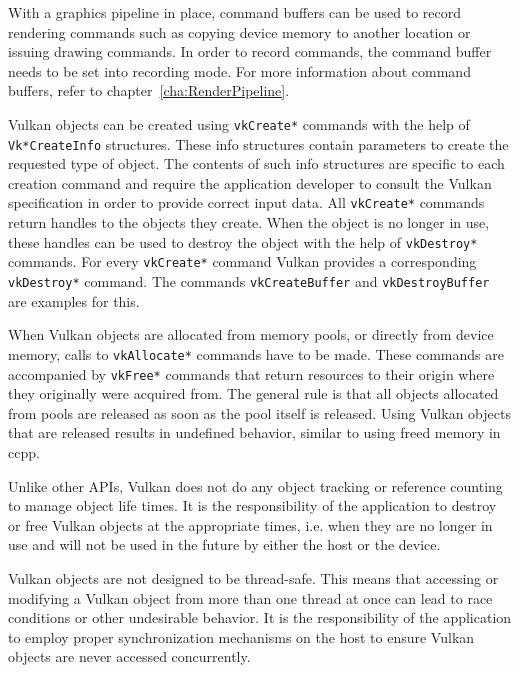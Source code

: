     With a graphics pipeline in place, command buffers can be used to record rendering commands such as copying \gls{device} memory to another location or issuing drawing commands. In order to record commands, the command buffer needs to be set into recording mode. For more information about command buffers, refer to chapter~\ref{cha:RenderPipeline}.

    Vulkan objects can be created using \lstinline{vkCreate*} commands with the help of \lstinline{Vk*CreateInfo} structures. These info structures contain parameters to create the requested type of object. The contents of such info structures are specific to each creation command and require the \gls{application} developer to consult the Vulkan specification in order to provide correct input data. All \lstinline{vkCreate*} commands return handles to the objects they create. When the object is no longer in use, these handles can be used to destroy the object with the help of \lstinline{vkDestroy*} commands. For every \lstinline{vkCreate*} command Vulkan provides a corresponding \lstinline{vkDestroy*} command. The commands \lstinline{vkCreateBuffer} and \lstinline{vkDestroyBuffer} are examples for this.

    When Vulkan objects are allocated from memory pools, or directly from \gls{device} memory, calls to \lstinline{vkAllocate*} commands have to be made. These commands are accompanied by \lstinline{vkFree*} commands that return resources to their origin where they originally were acquired from. The general rule is that all objects allocated from pools are released as soon as the pool itself is released. Using Vulkan objects that are released results in undefined behavior, similar to using freed memory in \gls{ccpp}.

    Unlike other APIs, Vulkan does not do any object tracking or reference counting to manage object life times. It is the responsibility of the \gls{application} to destroy or free Vulkan objects at the appropriate times, i.e. when they are no longer in use and will not be used in the future by either the \gls{host} or the device.

    Vulkan objects are not designed to be thread-safe. This means that accessing or modifying a Vulkan object from more than one thread at once can lead to race conditions or other undesirable behavior. It is the responsibility of the \gls{application} to employ proper synchronization mechanisms on the \gls{host} to ensure Vulkan objects are never accessed concurrently.


